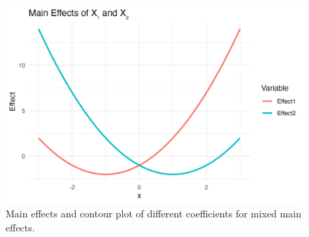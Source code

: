 \begin{figure}[htpb]
\begin{minipage}[t]{0.49\textwidth}
    \end{minipage}
    \hfill
    \begin{minipage}[t]{0.49\textwidth}
        \centering
        \includegraphics[width=\textwidth]{images/mixed_a1p20_a2m20_a11p10_a22p10_a12p00_rhop00_main.png}
    \end{minipage}
    \caption{Main effects and contour plot of different coefficients for mixed main effects.}
    \label{fig:mixed_rho_0}
\end{figure}

